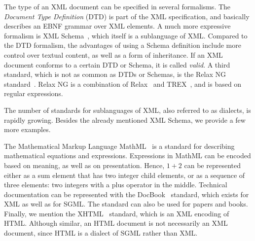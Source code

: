 
The type of an XML document can be specified in several formalisms. The {\em Document Type Definition} (DTD) is part of the XML specification, and basically describes an EBNF grammar over XML elements. A much more expressive formalism is XML Schema~\cite{xmlSchema1}, which itself is a sublanguage of XML. Compared to the DTD formalism, the advantages of using a Schema definition include more control over textual content, as well as a form of inheritance. If an XML document conforms to a certain DTD or Schema, it is called {\em valid}. A third standard, which is not as common as DTDs or Schemas, is the Relax NG standard~\cite{relaxNG01}. Relax NG is a combination of Relax~\cite{relax01} and TREX~\cite{trex01}, and is based on regular expressions. 



The number of standards for sublanguages of XML, also referred to as dialects, is rapidly growing. Besides the already mentioned XML Schema, we provide a few more examples.

The Mathematical Markup Language MathML~\cite{mathml20} is a standard for describing mathematical equations and expressions.  \bc Expressions in MathML can be encoded based on  meaning, as well as on presentation. Hence, $1+2$ can be represented either as a sum  element that has two integer child elements, or as a sequence of three elements: two integers with a plus operator in the middle.  \ec Technical documentation can be represented with the DocBook~\cite{walsh02docbook} standard, which exists for XML as well as for SGML. The standard can also be used for papers and books. Finally, we mention the XHTML~\cite{xhtml11} standard, which is an XML encoding of HTML. Although similar, an HTML document is not necessarily an XML document, since HTML is a dialect of SGML rather than XML.




